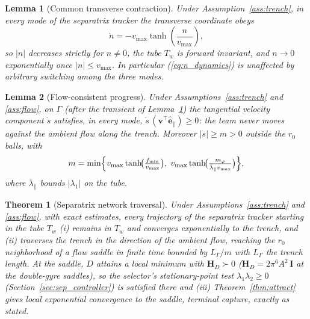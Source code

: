 \documentclass[lettersize,journal]{IEEEtran}
\newtheorem{theorem}{Theorem}
\newtheorem{lemma}{Lemma}
\begin{document}
\begin{lemma}[Common transverse contraction]
\label{lem:transverse}
Under Assumption~\ref{ass:trench}, in every mode of the separatrix
tracker the transverse coordinate obeys
\begin{equation}
    \dot{n} = -v_{\max}\tanh\!\left(\frac{n}{v_{\max}}\right),
    \label{eq:n_dynamics}
\end{equation}
so $|n|$ decreases strictly for $n \neq 0$, the tube $T_w$ is forward
invariant, and $n \to 0$ exponentially once $|n| \leq v_{\max}$. In
particular (\ref{eq:n_dynamics}) is unaffected by arbitrary switching
among the three modes.
\end{lemma}

\begin{lemma}[Flow-consistent progress]
\label{lem:progress}
Under Assumptions~\ref{ass:trench} and \ref{ass:flow}, on $\Gamma$
(after the transient of Lemma~\ref{lem:transverse}) the tangential
velocity component $\dot{s}$ satisfies, in every mode,
$\dot{s}\,(\mathbf{v}^\top \hat{\mathbf{e}}_\parallel) \geq 0$: the team
never moves against the ambient flow along the trench. Moreover
$|\dot{s}| \geq m > 0$ outside the $r_0$ balls, with
\begin{equation}
    m = \min\Bigl\{
    v_{\max}\tanh\!\bigl(\tfrac{f_{\min}}{v_{\max}}\bigr),\;
    v_{\max}\tanh\!\bigl(\tfrac{m_\varphi}
    {\bar{\lambda}_\parallel v_{\max}}\bigr)
    \Bigr\},
    \label{eq:progress_rate}
\end{equation}
where $\bar{\lambda}_\parallel$ bounds $|\lambda_1|$ on the tube.
\end{lemma}

\begin{theorem}[Separatrix network traversal]
\label{thm:separatrix}
Under Assumptions~\ref{ass:trench} and \ref{ass:flow}, with exact
estimates, every trajectory of the separatrix tracker starting in the
tube $T_w$
(i) remains in $T_w$ and converges exponentially to the trench, and (ii)
traverses the trench in the direction of the ambient flow, reaching the
$r_0$ neighborhood of a flow saddle in finite time bounded by
$L_\Gamma/m$ with $L_\Gamma$ the trench length. At the saddle, $D$
attains a local minimum with $\mathbf{H}_D \succ 0$
($\mathbf{H}_D = 2\pi^6 A^2\,\mathbf{I}$ at the double-gyre saddles), so
the selector's stationary-point test $\lambda_1\lambda_2 \geq 0$
(Section~\ref{sec:sep_controller}) is satisfied there and (iii)
Theorem~\ref{thm:attract} gives local exponential convergence to the
saddle, terminal capture, exactly as stated.
\end{theorem}
\end{document}
